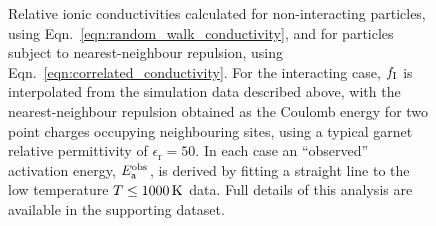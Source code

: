 \documentclass[aps,prb,twocolumn,superscriptaddress,reprint]{revtex4-1}
\begin{document}
\begin{figure}[tb]
  \centering
    \caption{\label{fig:arrhenius_example}Relative ionic conductivities calculated for non-interacting particles, using Eqn.~\ref{eqn:random_walk_conductivity}, and for particles subject to nearest-neighbour repulsion, using Eqn.~\ref{eqn:correlated_conductivity}. For the interacting case, $f_{\mathrm{I}}$ is interpolated from the simulation data described above, with the nearest-neighbour repulsion obtained as the Coulomb energy for two point charges occupying neighbouring sites, using a typical garnet relative permittivity of $\epsilon_\mathrm{r}=50$.\cite{RettenwanderEtAl_InorgChem2015} In each case an ``observed'' activation energy, $E_{\mathrm{a}}^{\mathrm{obs}}$, is derived by fitting a straight line to the low temperature $T\leq1000\,\mathrm{K}$ data. Full details of this analysis are available in the supporting dataset.\cite{morgan_benjamin_j_2017_821864}}
\end{figure}
\end{document}
